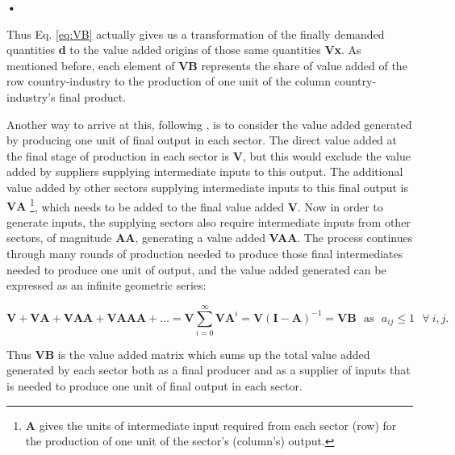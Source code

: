 \textbf{\textbf{•}}\documentclass[a4paper]{article}
\begin{document}
Thus Eq. \ref{eq:VB} actually gives us a transformation of the finally demanded quantities \textbf{d} to the value added origins of those same quantities \textbf{Vx}. As mentioned before, each element of \textbf{VB} represents the share of value added of the row country-industry to the production of one unit of the column country-industry's final product.  \newline


Another way to arrive at this, following \citet{Wang2014}, is to consider the value added generated by producing one unit of final output in each sector. The direct value added at the final stage of production in each sector is \textbf{V}, but this would exclude the value added by suppliers supplying intermediate inputs to this output. The additional value added by other sectors supplying intermediate inputs to this final output is $\textbf{V}\textbf{A}$ \footnote{\textbf{A} gives the units of intermediate input required from each sector (row) for the production of one unit of the sector's (column's) output.}, which needs to be added to the final value added \textbf{V}. 
Now in order to generate inputs, the supplying sectors also require intermediate inputs from other sectors, of magnitude \textbf{AA}, generating a value added \textbf{VAA}.  The process continues through many rounds of production needed to produce those final intermediates needed to produce one unit of output, and the value added generated can be expressed as an infinite geometric series:

\begin{equation}
\textbf{V} +\textbf{VA} + \textbf{VAA}+ \textbf{VAAA} + \dots = \textbf{V} \sum_{i=0}^\infty \textbf{VA}^i = \textbf{V}(\textbf{I}-\textbf{A})^{-1} = \textbf{VB}\ \ \ \text{as}\ \ \ a_{ij} \leq 1\ \ \ \forall\ i,j.
\end{equation}

Thus \textbf{VB} is the value added matrix which sums up the total value added generated by each sector both as a final producer and as a supplier of inputs that is needed to produce one unit of final output in each sector.  \newline

\end{document}
